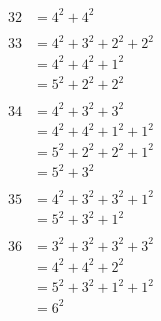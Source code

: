\documentclass{article}
\numberwithin{equation}{section}
\begin{document}
\begin{multicols}{3}
\begin{align*}
\\
32 & = 4^2 + 4^2\\
\\
33 & = 4^2 + 3^2 + 2^2 + 2^2\\
   & = 4^2 + 4^2 + 1^2\\
   & = 5^2 + 2^2 + 2^2\\
\\
34 & = 4^2 + 3^2 + 3^2\\
   & = 4^2 + 4^2 + 1^2 + 1^2\\
   & = 5^2 + 2^2 + 2^2 + 1^2\\
   & = 5^2 + 3^2\\
\\
35 & = 4^2 + 3^2 + 3^2 + 1^2\\
   & = 5^2 + 3^2 + 1^2\\
\\
36 & = 3^2 + 3^2 + 3^2 + 3^2\\
   & = 4^2 + 4^2 + 2^2\\
   & = 5^2 + 3^2 + 1^2 + 1^2\\
   & = 6^2\\
\end{align*}
\end{multicols}

\pagebreak
\end{document}
